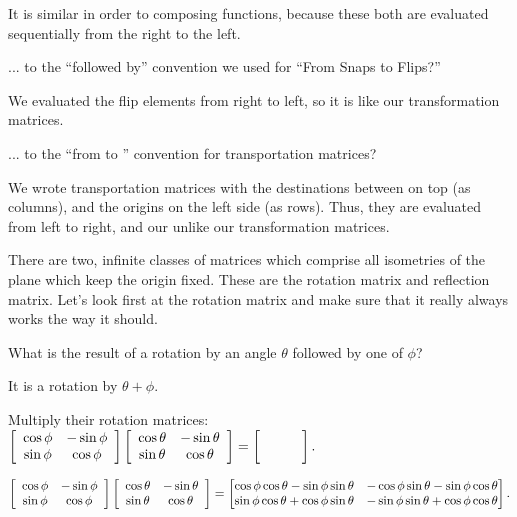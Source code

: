 \documentclass[../key.tex]{subfiles}
\begin{document}
It is similar in order to composing functions, because these both are evaluated sequentially from the right to the left.

\begin{iinner_problem}
\item ... to the ``followed by'' convention we used for ``From Snaps to Flips?''
\end{iinner_problem}

We evaluated the flip elements from right to left, so it is like our transformation matrices.

\begin{iinner_problem}
\item ... to the ``from \underline{\phantom{0}} to \underline{\phantom{0}}'' convention for transportation matrices?
\end{iinner_problem}

We wrote transportation matrices with the destinations between on top (as columns), and the origins on the left side (as rows). Thus, they are evaluated from left to right, and our unlike our transformation matrices.

\begin{outer_problem}
\item There are two, infinite classes of matrices which comprise all isometries of the plane which keep the origin fixed. These are the rotation matrix and reflection matrix. Let's look first at the rotation matrix and make sure that it really always works the way it should.
\end{outer_problem}

\begin{inner_problem}[start=1]
\item What is the result of a rotation by an angle $\theta$ followed by one of $\phi$?
\end{inner_problem}

It is a rotation by $\theta + \phi$.

\begin{inner_problem}
\item Multiply their rotation matrices: $\twomat{\cos \phi}{-\sin \phi}{\sin\phi}{\cos\phi} \twomat{\cos \theta}{-\sin \theta}{\sin\theta}{\cos\theta}=\blanktwomat.$
\end{inner_problem}

$$\left[\begin{array}{cc} \cos \phi & -\sin \phi \\ \sin\phi & \cos\phi \end{array}\right] \left[\begin{array}{cc} \cos \theta & -\sin \theta \\ \sin\theta & \cos\theta \end{array}\right] = \begin{bmatrix} \cos\phi\cos\theta - \sin\phi\sin\theta & -\cos\phi\sin\theta-\sin\phi\cos\theta \\ \sin\phi\cos\theta + \cos\phi\sin\theta & -\sin\phi\sin\theta+\cos\phi\cos\theta \end{bmatrix}.$$
\end{document}

